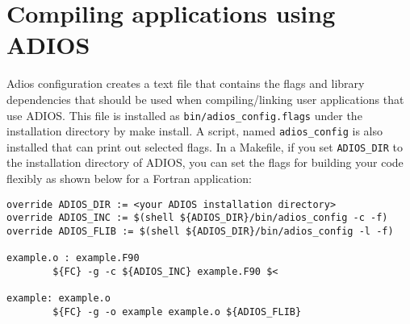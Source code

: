 \section{Compiling applications using ADIOS}

Adios configuration creates a text file that contains the flags and library dependencies 
that should be used when compiling/linking user applications that use ADIOS. This 
file is installed as \verb+bin/adios_config.flags+ under the installation directory by 
make install. A script, named \verb+adios_config+ is also installed that can print out 
selected flags. In a Makefile, if you set \verb+ADIOS_DIR+ to the installation directory 
of ADIOS, you can set the flags for building your code flexibly as shown below 
for a Fortran application: 

\begin{lstlisting}
override ADIOS_DIR := <your ADIOS installation directory>
override ADIOS_INC := $(shell ${ADIOS_DIR}/bin/adios_config -c -f)
override ADIOS_FLIB := $(shell ${ADIOS_DIR}/bin/adios_config -l -f)

example.o : example.F90
        ${FC} -g -c ${ADIOS_INC} example.F90 $<

example: example.o
        ${FC} -g -o example example.o ${ADIOS_FLIB} 
\end{lstlisting}

